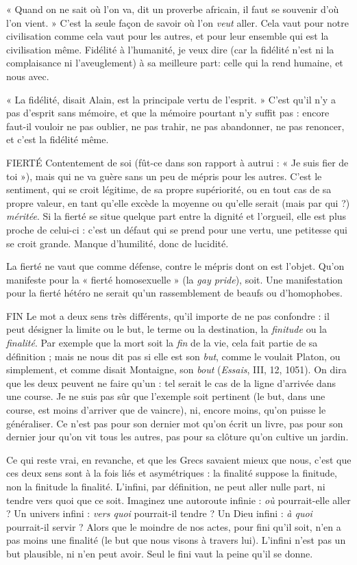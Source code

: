 « Quand on ne sait où l’on va, dit un proverbe africain, il faut se souvenir
d’où l’on vient. » C’est la seule façon de savoir où l’on {\it veut} aller. Cela vaut pour
notre civilisation comme cela vaut pour les autres, et pour leur ensemble qui est
la civilisation même. Fidélité à l'humanité, je veux dire (car la fidélité n’est ni
la complaisance ni l’aveuglement) à sa meilleure part: celle qui la rend
humaine, et nous avec.

« La fidélité, disait Alain, est la principale vertu de l'esprit. » C’est qu’il n’y
a pas d’esprit sans mémoire, et que la mémoire pourtant n’y suffit pas : encore
faut-il vouloir ne pas oublier, ne pas trahir, ne pas abandonner, ne pas
renoncer, et c’est la fidélité même.

FIERTÉ  Contentement de soi (fût-ce dans son rapport à autrui : « Je suis
fier de toi »), mais qui ne va guère sans un peu de mépris pour les
autres. C’est le sentiment, qui se croit légitime, de sa propre supériorité, ou en
tout cas de sa propre valeur, en tant qu’elle excède la moyenne ou qu’elle serait
(mais par qui ?) {\it méritée}. Si la fierté se situe quelque part entre la dignité et
l’orgueil, elle est plus proche de celui-ci : c’est un défaut qui se prend pour une
vertu, une petitesse qui se croit grande. Manque d’humilité, donc de lucidité.

La fierté ne vaut que comme défense, contre le mépris dont on est l’objet.
Qu’on manifeste pour la « fierté homosexuelle » (la {\it gay pride}), soit. Une manifestation
pour la fierté hétéro ne serait qu’un rassemblement de beaufs ou
d’homophobes.

FIN Le mot a deux sens très différents, qu’il importe de ne pas confondre :
il peut désigner la limite ou le but, le terme ou la destination, la {\it finitude}
ou la {\it finalité}. Par exemple que la mort soit la {\it fin} de la vie, cela fait partie
de sa définition ; mais ne nous dit pas si elle est son {\it but}, comme le voulait
Platon, ou simplement, et comme disait Montaigne, son {\it bout} ({\it Essais}, III, 12,
1051). On dira que les deux peuvent ne faire qu’un : tel serait le cas de la ligne
d’arrivée dans une course. Je ne suis pas sûr que l’exemple soit pertinent (le but,
dans une course, est moins d’arriver que de vaincre), ni, encore moins, qu’on
puisse le généraliser. Ce n’est pas pour son dernier mot qu’on écrit un livre, pas
pour son dernier jour qu’on vit tous les autres, pas pour sa clôture qu’on cultive
un jardin.

Ce qui reste vrai, en revanche, et que les Grecs savaient mieux que nous,
c’est que ces deux sens sont à la fois liés et asymétriques : la finalité suppose la
finitude, non la finitude la finalité. L’infini, par définition, ne peut aller nulle
part, ni tendre vers quoi que ce soit. Imaginez une autoroute infinie : {\it où} pourrait-elle
aller ? Un univers infini : {\it vers quoi} pourrait-il tendre ? Un Dieu infini :
{\it à quoi} pourrait-il servir ? Alors que le moindre de nos actes, pour fini qu’il soit,
n’en a pas moins une finalité (le but que nous visons à travers lui). L’infini n’est
pas un but plausible, ni n’en peut avoir. Seul le fini vaut la peine qu’il se donne.


